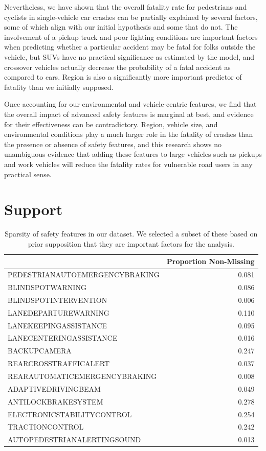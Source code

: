 \documentclass[12pt]{article}
\begin{document}
Nevertheless, we have shown that the overall fatality rate for pedestrians and cyclists in single-vehicle car
crashes can be partially explained by several factors, some of which align with our initial hypothesis and
some that do not. The involvement of a pickup truck and poor lighting conditions are important factors
when predicting whether a particular accident may be fatal for folks outside the vehicle, but SUVs have no practical
significance as estimated by the model, and crossover vehicles actually decrease the probability of a fatal accident
as compared to cars. Region is also a significantly more important predictor of fatality than we initially supposed.

Once accounting for our environmental and vehicle-centric features, we find that the overall impact
of advanced safety features is marginal at best, and evidence for their effectiveness
can be contradictory. Region, vehicle size, and environmental conditions play a much
larger role in the fatality of crashes than the presence or absence of safety features, and this research
shows no unambiguous evidence that adding these features to large vehicles such as pickups
and work vehicles will reduce the fatality rates for vulnerable road users in any practical sense.

\section{Support}

\begin{table}[h]
    \centering
    \begin{tabular}{lr}
        \toprule
         & Proportion Non-Missing \\
        \midrule
        PEDESTRIANAUTOEMERGENCYBRAKING & 0.081 \\
        BLINDSPOTWARNING & 0.086 \\
        BLINDSPOTINTERVENTION & 0.006 \\
        LANEDEPARTUREWARNING & 0.110 \\
        LANEKEEPINGASSISTANCE & 0.095 \\
        LANECENTERINGASSISTANCE & 0.016 \\
        BACKUPCAMERA & 0.247 \\
        REARCROSSTRAFFICALERT & 0.037 \\
        REARAUTOMATICEMERGENCYBRAKING & 0.008 \\
        ADAPTIVEDRIVINGBEAM & 0.049 \\
        ANTILOCKBRAKESYSTEM & 0.278 \\
        ELECTRONICSTABILITYCONTROL & 0.254 \\
        TRACTIONCONTROL & 0.242 \\
        AUTOPEDESTRIANALERTINGSOUND & 0.013 \\
        \bottomrule
    \end{tabular}
    \caption{Sparsity of safety features in our dataset. We selected a subset of these based on prior supposition
    that they are important factors for the analysis.}
    \label{tab:safety_sparsity}
\end{table}
\end{document}
